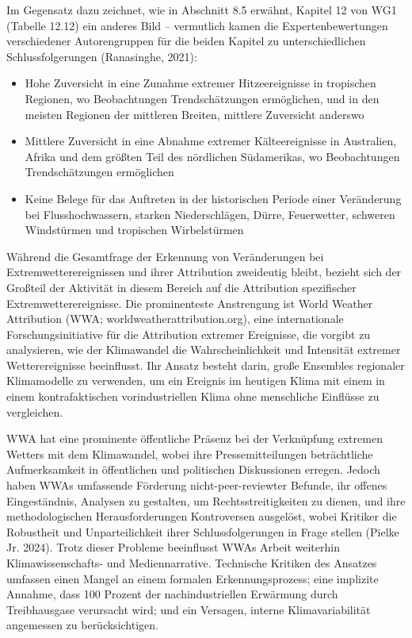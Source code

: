 \documentclass[12pt,paper=a4,DIV=12,parskip=never,chapterprefix=false,headings=standardclasses]{scrreprt}
\begin{document}
Im Gegensatz dazu zeichnet, wie in Abschnitt 8.5 erwähnt, Kapitel 12 von WG1 (Tabelle 12.12) ein anderes Bild – vermutlich kamen die Expertenbewertungen verschiedener Autorengruppen für die beiden Kapitel zu unterschiedlichen Schlussfolgerungen (Ranasinghe, 2021):

\begin{itemize}
\item Hohe Zuversicht in eine Zunahme extremer Hitzeereignisse in tropischen Regionen, wo Beobachtungen Trendschätzungen ermöglichen, und in den meisten Regionen der mittleren Breiten, mittlere Zuversicht anderswo 
\item Mittlere Zuversicht in eine Abnahme extremer Kälteereignisse in Australien, Afrika und dem größten Teil des nördlichen Südamerikas, wo Beobachtungen Trendschätzungen ermöglichen 
\item Keine Belege für das Auftreten in der historischen Periode einer Veränderung bei Flusshochwassern, starken Niederschlägen, Dürre, Feuerwetter, schweren Windstürmen und tropischen Wirbelstürmen 
\end{itemize}

Während die Gesamtfrage der Erkennung von Veränderungen bei Extremwetterereignissen und ihrer Attribution zweideutig bleibt, bezieht sich der Großteil der Aktivität in diesem Bereich auf die Attribution spezifischer Extremwetterereignisse.
Die prominenteste Anstrengung ist World Weather Attribution (WWA; worldweatherattribution.org), eine internationale Forschungsinitiative für die Attribution extremer Ereignisse, die vorgibt zu analysieren, wie der Klimawandel die Wahrscheinlichkeit und Intensität extremer Wetterereignisse beeinflusst. Ihr Ansatz besteht darin, große Ensembles regionaler Klimamodelle zu verwenden, um ein Ereignis im heutigen Klima mit einem in einem kontrafaktischen vorindustriellen Klima ohne menschliche Einflüsse zu vergleichen.

WWA hat eine prominente öffentliche Präsenz bei der Verknüpfung extremen Wetters mit dem Klimawandel, wobei ihre Pressemitteilungen beträchtliche Aufmerksamkeit in öffentlichen und politischen Diskussionen erregen. Jedoch haben WWAs umfassende Förderung nicht-peer-reviewter Befunde, ihr offenes Eingeständnis, Analysen zu gestalten, um Rechtsstreitigkeiten zu dienen, und ihre methodologischen Herausforderungen Kontroversen ausgelöst, wobei Kritiker die Robustheit und Unparteilichkeit ihrer Schlussfolgerungen in Frage stellen (Pielke Jr. 2024). Trotz dieser Probleme beeinflusst WWAs Arbeit weiterhin Klimawissenschafts- und Mediennarrative. Technische Kritiken des Ansatzes umfassen einen Mangel an einem formalen Erkennungsprozess; eine implizite Annahme, dass 100 Prozent der nachindustriellen Erwärmung durch Treibhausgase verursacht wird; und ein Versagen, interne Klimavariabilität angemessen zu berücksichtigen.
\end{document}
